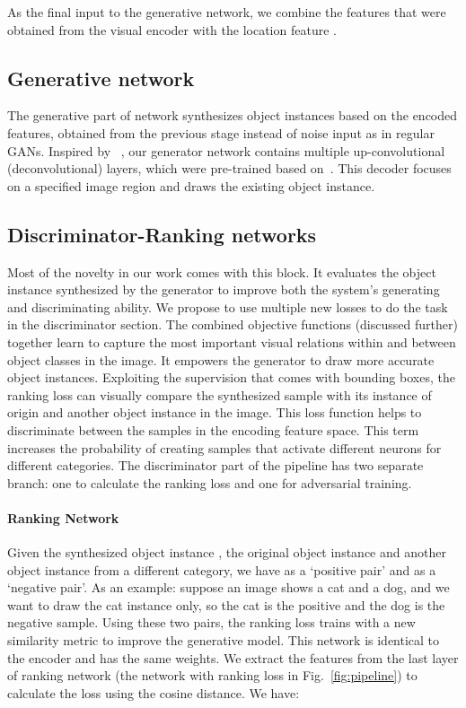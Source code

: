 \documentclass[runningheads]{llncs}
\begin{document}
As the final input to the generative network, we combine the features that were obtained from the visual encoder with the location feature .  

\subsection{Generative network}
The generative part of network synthesizes object instances based on the encoded features, obtained from the previous stage instead of noise input as in regular GANs. Inspired by ~\cite{dosovitskiy2,gap}, our generator network contains multiple up-convolutional (deconvolutional) layers, which were pre-trained based on~\cite{dosovitskiy2}. This decoder focuses on a specified image region and draws the existing object instance.


\subsection{Discriminator-Ranking networks}
Most of the novelty in our work comes with this block. It evaluates the object instance synthesized by the generator to improve both the system's generating and discriminating ability. We propose to use multiple new losses to do the task in the discriminator section. The combined objective functions (discussed further) together learn to capture the most important visual relations within and between object classes in the image. It empowers the generator to draw more accurate object instances. Exploiting the supervision that comes with bounding boxes, the ranking loss can visually compare the synthesized sample with its instance of origin and another object instance in the image. This loss function helps to discriminate between the samples in the encoding feature space. This term increases the probability of creating samples that activate different neurons for different categories. The discriminator part of the pipeline has two separate branch: one to calculate the ranking loss and one for adversarial training.

\paragraph{Ranking Network}
Given the synthesized object instance , the original object instance  and another object instance  from a different category, we have   as a `positive pair' and  as a `negative pair'. As an example: suppose an image shows a cat and a dog, and we want to draw the cat instance only, so the cat is the positive and the dog is the negative sample. Using these two pairs, the ranking loss trains with a new similarity metric to improve the generative model. This network is identical to the encoder and has the same weights. We extract the features  from the last layer of ranking network (the network with ranking loss in Fig.~\ref{fig:pipeline}) to calculate the loss using the cosine distance. We have:
\end{document}
